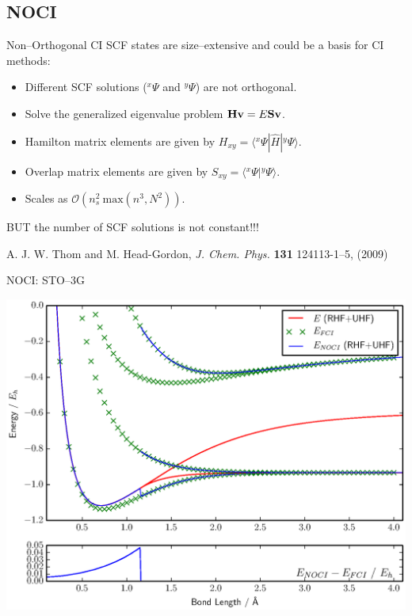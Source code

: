 \documentclass{beamer}
\newcommand{\braket}[3] {{\langle #1 | #2 | #3 \rangle}}
\newcommand{\brket}[2] {{\langle #1 | #2  \rangle}}
\newcommand{\up}[2] {{^{#1}\!#2}}
\begin{document}
\subsection{NOCI}
\begin{frame}{Non--Orthogonal CI}
SCF states are size--extensive and could be a basis for CI methods:
\vspace{1em}
 \begin{itemize}
  \item Different SCF solutions ($\up{x}{\Psi}$ and $\up{y}{\Psi}$) are \alert{not orthogonal}.
  \item Solve the generalized eigenvalue problem ${\bf H v}=E{\bf S v}$.
  \item Hamilton matrix elements are given by $H_{xy}=\braket{\up{x}\Psi}{\hat H}{\up y\Psi}$.
  \item Overlap matrix elements are given by $S_{xy}=\brket{\up{x}\Psi}{\up y\Psi}$.
  \item Scales as $\mathcal{O}\left( n_s^2\ \mathrm{max}\left(n^3, N^2\right) \right).$
 \end{itemize}
 \vspace{0.5em}
   \begin{center} 
BUT the number of SCF solutions is \alert{not constant}!!!
  \end{center}
\vspace{0.5em} 
{\tiny A. J. W. Thom and M. Head-Gordon, {\it J. Chem. Phys.} {\bf 131} 124113-1--5, (2009)}
\end{frame}

\begin{frame}{NOCI:  STO--3G}
  \begin{center}
  \includegraphics[scale=0.4]{H2_normal}
  \end{center}
\end{frame}
\end{document}
